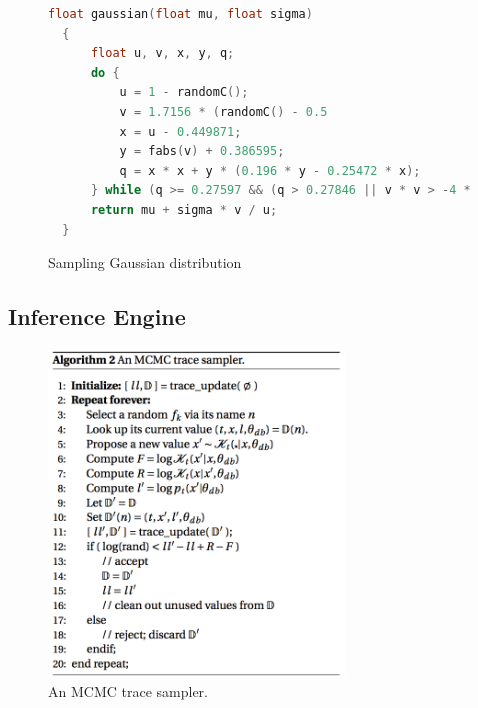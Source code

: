 \begin{figure}
\begin{lstlisting}[language=C]
  float gaussian(float mu, float sigma)
  {
      float u, v, x, y, q;
      do {
          u = 1 - randomC();
          v = 1.7156 * (randomC() - 0.5
          x = u - 0.449871;
          y = fabs(v) + 0.386595;
          q = x * x + y * (0.196 * y - 0.25472 * x);
      } while (q >= 0.27597 && (q > 0.27846 || v * v > -4 * u * u * log(u)));
      return mu + sigma * v / u;
  }
\end{lstlisting}
\caption{Sampling Gaussian distribution}
\label{fig:gaussian}
\end{figure}

\subsection{Inference Engine}

\begin{figure}
    \centering
    \includegraphics[width=0.7\textwidth]{figures/trace1.png}
    \caption{An MCMC trace sampler.}
    \label{fig:trace1}
\end{figure}

